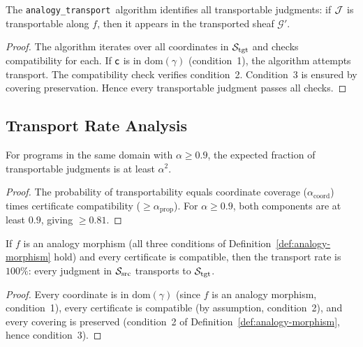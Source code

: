\documentclass[11pt]{article}
\newcommand{\AnalogyTransport}{\texttt{analogy\_transport}}
\newcommand{\SourceSite}{\Site_{\mathrm{src}}}
\newcommand{\TargetSite}{\Site_{\mathrm{tgt}}}
\newcommand{\AnalogyScore}{\alpha}
\newcommand{\CompMap}{\gamma}
\begin{document}
\begin{theorem}\label{thm:transport-complete}
The \AnalogyTransport\ algorithm identifies all transportable judgments:
if $\mathcal{J}$ is transportable along $f$, then it appears in the transported
sheaf $\mathcal{G}'$.
\end{theorem}

\begin{proof}
The algorithm iterates over all coordinates in $\TargetSite$ and checks
compatibility for each.  If $\mathsf{c}$ is in $\mathrm{dom}(\CompMap)$
(condition~1), the algorithm attempts transport.  The compatibility
check verifies condition~2.  Condition~3 is ensured by covering
preservation.  Hence every transportable judgment passes all checks.
\end{proof}

\subsection{Transport Rate Analysis}

\begin{proposition}\label{prop:transport-rate}
For programs in the same domain with $\AnalogyScore \geq 0.9$,
the expected fraction of transportable judgments is at least
$\AnalogyScore^2$.
\end{proposition}

\begin{proof}
The probability of transportability equals coordinate coverage
($\AnalogyScore_{\text{coord}}$) times certificate compatibility
($\geq \AnalogyScore_{\text{prop}}$).  For $\AnalogyScore \geq 0.9$,
both components are at least $0.9$, giving $\geq 0.81$.
\end{proof}

\begin{theorem}\label{thm:maximal-transport}
If $f$ is an analogy morphism (all three conditions of
Definition~\ref{def:analogy-morphism} hold) and every certificate is
compatible, then the transport rate is $100\%$: every judgment in
$\SourceSite$ transports to $\TargetSite$.
\end{theorem}

\begin{proof}
Every coordinate is in $\mathrm{dom}(\CompMap)$ (since $f$ is an
analogy morphism, condition~1), every certificate is compatible
(by assumption, condition~2), and every covering is preserved
(condition~2 of Definition~\ref{def:analogy-morphism}, hence condition~3).
\end{proof}
\end{document}
